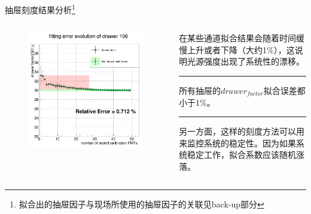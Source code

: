 \documentclass[11pt,compress,xcolor=x11names,UTF8]{beamer}
\begin{document}
\begin{frame}{抽屉刻度结果分析\footnote{拟合出的抽屉因子与现场所使用的抽屉因子的关联见back-up部分}}
\begin{columns}
\begin{column}{.5\textwidth}
\begin{figure}
\centering
\includegraphics[width=\textwidth]{lt106} %
\end{figure}
\end{column}
\begin{column}{.45\textwidth}
在某些通道拟合结果会随着时间缓慢上升或者下降（大约1\%），这说明光源强度出现了系统性的漂移。

\vspace{.5cm}
\hrule{\textwidth}
\vspace{.5cm}

\alert{所有抽屉的$drawer_{factor}$拟合误差都小于1\%}。

\vspace{.5cm}
\hrule{\textwidth}
\vspace{.5cm}

另一方面，这样的刻度方法可以用来监控系统的稳定性。因为如果系统稳定工作，拟合系数应该随机涨落。

\end{column}
\end{columns}
\end{frame}
\end{document}

